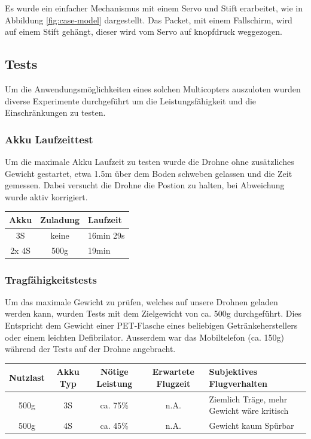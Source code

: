 Es wurde ein einfacher Mechanismus mit einem Servo und Stift erarbeitet, wie in Abbildung \ref{fig:case-model}  dargestellt. 
Das Packet, mit einem Fallschirm, wird auf einem Stift gehängt, dieser wird vom Servo auf knopfdruck weggezogen. 


\subsection{Tests}

Um die Anwendungsmöglichkeiten eines solchen Multicopters auszuloten wurden diverse Experimente durchgeführt um die Leistungsfähigkeit und die Einschränkungen zu testen. 

\subsubsection{Akku Laufzeittest}
Um die maximale Akku Laufzeit zu testen wurde die Drohne ohne zusätzliches Gewicht gestartet, etwa 1.5m über dem Boden schweben gelassen und die Zeit gemessen. Dabei versucht die Drohne die Postion zu halten, bei Abweichung wurde aktiv korrigiert. \\

\begin{tabularx}{\textwidth}{|c|c|X|}
\hline
\textbf{Akku} & \textbf{Zuladung} & \textbf{Laufzeit} \\ \hline \hline 
3S & keine & 16min 29s\\ \hline 
2x 4S & 500g & 19min\\ \hline 
\end{tabularx}
\newpage
\subsubsection{Tragfähigkeitstests}
Um das maximale Gewicht zu prüfen, welches auf unsere Drohnen geladen werden kann, wurden Tests mit dem Zielgewicht von ca. 500g durchgeführt. Dies Entspricht dem Gewicht einer PET-Flasche eines beliebigen Getränkeherstellers oder einem leichten Defibrilator. Ausserdem war das Mobiltelefon (ca. 150g) während der Tests auf der Drohne angebracht.  \\

\begin{tabularx}{\textwidth}{|c|c|c|c|X|}
\hline
\textbf{Nutzlast} & \textbf{Akku Typ} & \textbf{Nötige Leistung }& \textbf{Erwartete Flugzeit } & \textbf{Subjektives Flugverhalten }\\
\hline \hline
500g & 3S & ca. 75\%  & n.A. & Ziemlich Träge, mehr Gewicht wäre kritisch\\\hline
500g & 4S & ca. 45\%  & n.A. & Gewicht kaum Spürbar\\
\hline
\end{tabularx}\\

